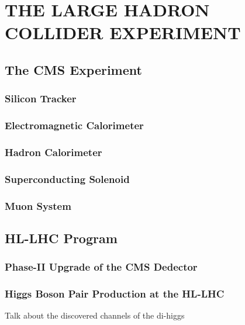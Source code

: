 \chapter{THE LARGE HADRON COLLIDER EXPERIMENT}\label{Ch2}

\section{The CMS Experiment}

\subsection{Silicon Tracker}

\subsection{Electromagnetic Calorimeter}

\subsection{Hadron Calorimeter}

\subsection{Superconducting Solenoid}

\subsection{Muon System}

\section{HL-LHC Program}

\subsection{Phase-II Upgrade of the CMS Dedector}

\subsection{Higgs Boson Pair Production at the HL-LHC}

Talk about the discovered channels of the di-higgs